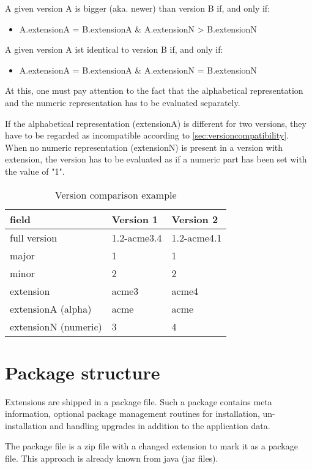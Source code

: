 A given version A is bigger (aka. newer) than version B if, and only if:
\begin{itemize}
\item A.extensionA = B.extensionA \& A.extensionN > B.extensionN
\end{itemize}

A given version A ist identical to version B if, and only if:
\begin{itemize}
\item A.extensionA = B.extensionA \& A.extensionN = B.extensionN
\end{itemize}

At this, one must pay attention to the fact that the alphabetical representation and the numeric representation has to be evaluated separately.

If the alphabetical representation (extensionA) is different for two versions, they have to be regarded as incompatible according to \ref{sec:versioncompatibility}. When no numeric representation (extensionN) is present in a version with extension, the version has to be evaluated as if a numeric part has been set with the value of "1".

\small
\begin{longtable}{|p{}|p{}|p{}|}
\caption{Version comparison example} \\
\hline
\label{tab:versioncompareexamples}
\textbf{field} & \textbf{Version 1} & \textbf{Version 2} \\
\hline
full version & 1.2-acme3.4 & 1.2-acme4.1
\\ \hline
major & 1 & 1
\\ \hline
minor & 2 & 2
\\ \hline
extension & acme3 & acme4
\\ \hline
extensionA (alpha) & acme & acme
\\ \hline
extensionN (numeric) & 3 & 4
\\ \hline
\end{longtable}
\normalsize

\section[sec:packet structure]{Package structure}
Extensions are shipped in a package file. Such a package contains meta information, optional package management routines for installation, un-installation and handling upgrades in addition to the application data.

The package file is a zip file with a changed extension to mark it as a package file. This approach is already known \ie from java (jar files).

